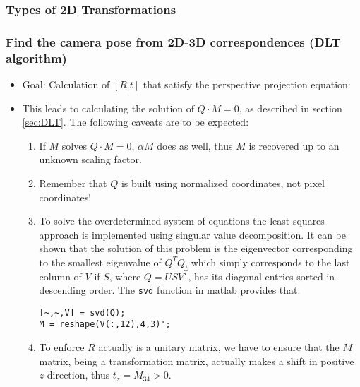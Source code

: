 \documentclass[10pt,a4paper]{scrartcl}
\begin{document}
\begin{multicols*}{2}
\subsubsection{Types of 2D Transformations}


\subsubsection{Find the camera pose from 2D-3D correspondences (DLT algorithm)}

\begin{itemize}
\item Goal: Calculation of $[R|t]$ that satisfy the perspective projection equation:

\item This leads to calculating the solution of $Q\cdot M = 0$, as described in section \ref{sec:DLT}. The following caveats are to be expected:
\begin{enumerate}
\item If $M$ solves $Q\cdot M = 0$, $\alpha M$ does as well, thus $M$ is recovered up to an unknown scaling factor.
\item Remember that $Q$ is built using normalized coordinates, not pixel coordinates!
\item To solve the overdetermined system of equations the least squares approach is implemented using singular value decomposition. It can be shown that the solution of this problem is the eigenvector corresponding to the smallest eigenvalue of $Q^TQ$, which simply corresponds to the last column of $V$ if $S$, where $Q = USV^T$, has its diagonal entries sorted in descending order. The \verb+svd+ function in matlab provides that.

\begin{verbatim}
[~,~,V] = svd(Q);
M = reshape(V(:,12),4,3)';
\end{verbatim}
\item To enforce $R$ actually is a unitary matrix, we have to ensure that the $M$ matrix, being a transformation matrix, actually makes a shift in positive $z$ direction, thus $t_z=M_{34}>0$.


\end{enumerate}
\end{itemize}
\end{multicols*}
\end{document}
